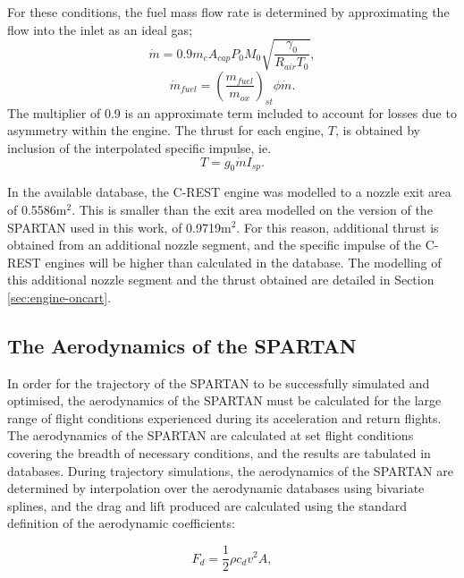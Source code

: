 For these conditions, the fuel mass flow rate is determined by approximating the flow into the inlet as an ideal gas; 
\begin{equation}
\dot{m} = 0.9 m_c A_{cap} P_0 M_0 \sqrt{\dfrac{\gamma_0}{R_{air} T_0}},
\end{equation}
\begin{equation}
\dot{m}_{fuel} = (\dfrac{m_{fuel}}{m_{ox}} )_{st} \phi \dot{m}.
\end{equation}
The multiplier of 0.9 is an approximate term included to account for losses due to asymmetry within the engine\cite{Preller2018a}. 
The thrust for each engine, $T$, is obtained by inclusion of the interpolated specific impulse, ie. 
\begin{equation}
T = g_0\dot{m}I_{sp}. 
\end{equation}

In the available database, the C-REST engine was modelled to a nozzle exit area of 0.5586m$^2$. This is smaller than the exit area modelled on the version of the SPARTAN used in this work, of 0.9719m$^2$. For this reason, additional thrust is obtained from an additional nozzle segment, and the specific impulse of the C-REST engines will be higher than calculated in the database. The modelling of this additional nozzle segment and the thrust obtained are detailed in Section \ref{sec:engine-oncart}.






		
		
		\subsection{The Aerodynamics of the SPARTAN}\label{sec:aero}
		
		
		
In order for the trajectory of the SPARTAN to be successfully simulated and optimised, the aerodynamics of the SPARTAN must be calculated for the large range of flight conditions experienced during its acceleration and return flights. 
The aerodynamics of the SPARTAN are calculated at set flight conditions covering the breadth of necessary conditions, and the results are tabulated in databases. During trajectory simulations, the aerodynamics of the SPARTAN are determined by interpolation over the aerodynamic databases using bivariate splines, and the drag and lift produced are calculated using the standard definition of the aerodynamic coefficients:

\begin{equation}
F_d = \frac{1}{2}\rho c_d v^2 A ,
\end{equation}

